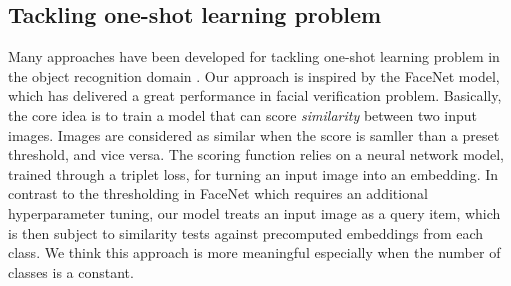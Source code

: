 \subsection{Tackling one-shot learning problem}

Many approaches have been developed for tackling one-shot learning problem in
the object recognition domain \cite{bromleySignatureVerificationUsing1994,
chopraLearningSimilarityMetric2005, kochSiameseNeuralNetworks2015a}.  Our
approach is inspired by the FaceNet
model\cite{chopraLearningSimilarityMetric2005}, which has delivered a great
performance in facial verification problem.  Basically, the core idea is to
train a model that can score \textit{similarity} between two input images.
Images are considered as similar when the score is samller than a preset
threshold, and vice versa.  The scoring function relies on a neural network
model, trained through a triplet loss, for turning an input image into an
embedding.  In contrast to the thresholding in FaceNet which requires an
additional hyperparameter tuning, our model treats an input image as a query
item, which is then subject to similarity tests against precomputed embeddings
from each class.  We think this approach is more meaningful especially when the
number of classes is a constant.  
